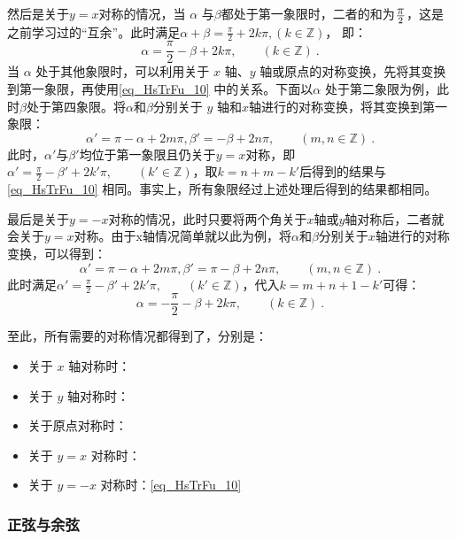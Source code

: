 然后是关于$y=x$对称的情况，当 $\alpha$ 与$\beta$都处于第一象限时，二者的和为$\displaystyle\pi \over2$，这是之前学习过的“互余”。此时满足$\displaystyle\alpha + \beta = \frac{\pi}{2} + 2k\pi, (k\in\mathbb{Z})$，
即：
\begin{equation}\label{eq_HsTrFu_10}
\alpha = \frac{\pi}{2} - \beta + 2k\pi, \qquad (k\in\mathbb{Z})~.
\end{equation}
当 $\alpha$ 处于其他象限时，可以利用关于 $x$ 轴、$y$ 轴或原点的对称变换，先将其变换到第一象限，再使用\autoref{eq_HsTrFu_10} 中的关系。下面以$\alpha$ 处于第二象限为例，此时$\beta$处于第四象限。将$\alpha$和$\beta$分别关于 $y$ 轴和$x$轴进行的对称变换，将其变换到第一象限：
\begin{equation}
\alpha' = \pi - \alpha+2m\pi,\beta' = - \beta+2n\pi,\qquad(m,n\in\mathbb{Z})~.
\end{equation}
此时，$\alpha'$与$\beta'$均位于第一象限且仍关于$y=x$对称，即
$\displaystyle\alpha'=\frac{\pi}{2} - \beta' + 2k'\pi, \qquad (k'\in\mathbb{Z})$，取$k=n+m-k'$后得到的结果与\autoref{eq_HsTrFu_10} 相同。事实上，所有象限经过上述处理后得到的结果都相同。

最后是关于$y=-x$对称的情况，此时只要将两个角关于$x$轴或$y$轴对称后，二者就会关于$y=x$对称。由于x轴情况简单就以此为例，将$\alpha$和$\beta$分别关于$x$轴进行的对称变换，可以得到：
\begin{equation}
\alpha' = \pi - \alpha+2m\pi,\beta' = \pi- \beta+2n\pi,\qquad(m,n\in\mathbb{Z})~.
\end{equation}
此时满足$\displaystyle\alpha'=\frac{\pi}{2} - \beta' + 2k'\pi, \qquad (k'\in\mathbb{Z})$，代入$k=m+n+1-k'$可得：
\begin{equation}\label{eq_HsTrFu_11}
\alpha = -\frac{\pi}{2} - \beta + 2k\pi, \qquad (k\in\mathbb{Z})~.
\end{equation}

至此，所有需要的对称情况都得到了，分别是：
\begin{itemize}
\item 关于 $x$ 轴对称时：
\item 关于 $y$ 轴对称时：
\item 关于原点对称时：
\item 关于 $y = x$ 对称时：
\item 关于 $y = -x$ 对称时：\autoref{eq_HsTrFu_10} 
\end{itemize}

\subsubsection{正弦与余弦}


